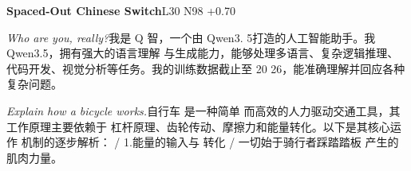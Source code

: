\begin{multicols}{2}
\noindent\textbf{Spaced-Out Chinese Switch}\hfill{\ttfamily L30 N98 +0.70}\par\noindent\textit{Who are you, really?}\enspace 我\allowbreak{}是\allowbreak{} Q 智\allowbreak{}，\allowbreak{}一\allowbreak{}个\allowbreak{}由\allowbreak{} Qwen3. 5打\allowbreak{}造\allowbreak{}的\allowbreak{}人\allowbreak{}工\allowbreak{}智\allowbreak{}能\allowbreak{}助\allowbreak{}手\allowbreak{}。\allowbreak{}我\allowbreak{} Qwen3.5，\allowbreak{}拥\allowbreak{}有\allowbreak{}强\allowbreak{}大\allowbreak{}的\allowbreak{}语\allowbreak{}言\allowbreak{}理\allowbreak{}解\allowbreak{} 与\allowbreak{}生\allowbreak{}成\allowbreak{}能\allowbreak{}力\allowbreak{}，\allowbreak{}能\allowbreak{}够\allowbreak{}处\allowbreak{}理\allowbreak{}多\allowbreak{}语\allowbreak{}言\allowbreak{}、\allowbreak{}复\allowbreak{}杂\allowbreak{}逻\allowbreak{}辑\allowbreak{}推\allowbreak{}理\allowbreak{}、\allowbreak{} 代\allowbreak{}码\allowbreak{}开\allowbreak{}发\allowbreak{}、\allowbreak{}视\allowbreak{}觉\allowbreak{}分\allowbreak{}析\allowbreak{}等\allowbreak{}任\allowbreak{}务\allowbreak{}。\allowbreak{}我\allowbreak{}的\allowbreak{}训\allowbreak{}练\allowbreak{}数\allowbreak{}据\allowbreak{}截\allowbreak{}止\allowbreak{}至\allowbreak{} 20 26，\allowbreak{}能\allowbreak{}准\allowbreak{}确\allowbreak{}理\allowbreak{}解\allowbreak{}并\allowbreak{}回\allowbreak{}应\allowbreak{}各\allowbreak{}种\allowbreak{}复\allowbreak{}杂\allowbreak{}问\allowbreak{}题\allowbreak{}。\allowbreak{}\par\noindent\textit{Explain how a bicycle works.}\enspace 自\allowbreak{}行\allowbreak{}车\allowbreak{} 是\allowbreak{}一\allowbreak{}种\allowbreak{}简\allowbreak{}单\allowbreak{} 而\allowbreak{}高\allowbreak{}效\allowbreak{}的\allowbreak{}人\allowbreak{}力\allowbreak{}驱\allowbreak{}动\allowbreak{}交\allowbreak{}通\allowbreak{}\allowbreak{}工\allowbreak{}具\allowbreak{}，\allowbreak{}其\allowbreak{}工\allowbreak{}作\allowbreak{}原\allowbreak{}理\allowbreak{}主\allowbreak{}要\allowbreak{}\allowbreak{}依\allowbreak{}赖\allowbreak{}于\allowbreak{} 杠\allowbreak{}杆\allowbreak{}原\allowbreak{}理\allowbreak{}、\allowbreak{}齿\allowbreak{}轮\allowbreak{}传\allowbreak{}动\allowbreak{}、\allowbreak{}\allowbreak{}摩\allowbreak{}擦\allowbreak{}力\allowbreak{}和\allowbreak{}能\allowbreak{}量\allowbreak{}转\allowbreak{}化\allowbreak{}。\allowbreak{}以\allowbreak{}\allowbreak{}下\allowbreak{}是\allowbreak{}其\allowbreak{}核\allowbreak{}心\allowbreak{}运\allowbreak{}作\allowbreak{} 机\allowbreak{}制\allowbreak{}的\allowbreak{}逐\allowbreak{}步\allowbreak{}解\allowbreak{}析\allowbreak{}：\allowbreak{} / 1.能\allowbreak{}量\allowbreak{}的\allowbreak{}输\allowbreak{}入\allowbreak{}与\allowbreak{} 转\allowbreak{}化\allowbreak{} / 一\allowbreak{}切\allowbreak{}始\allowbreak{}于\allowbreak{}骑\allowbreak{}行\allowbreak{}者\allowbreak{}踩\allowbreak{}踏\allowbreak{}踏\allowbreak{}板\allowbreak{} 产\allowbreak{}生\allowbreak{}的\allowbreak{}肌\allowbreak{}肉\allowbreak{}力\allowbreak{}量\allowbreak{}。\allowbreak{} 
\end{multicols}
